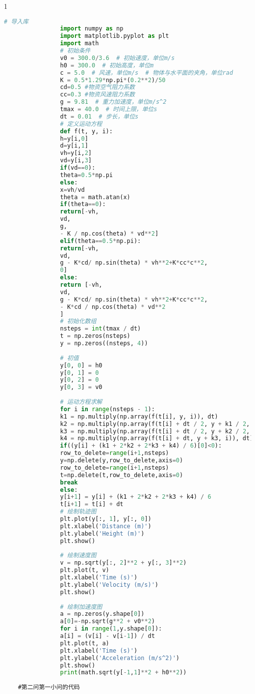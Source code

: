 \documentclass[normalsize]{ctexart}
\begin{document}
\begin{spacing}{1}
\begin{lstlisting}[language={Python}]
				# 导入库
				import numpy as np
				import matplotlib.pyplot as plt
				import math
				# 初始条件
				v0 = 300.0/3.6  # 初始速度，单位m/s
				h0 = 300.0  # 初始高度，单位m
				c = 5.0  # 风速，单位m/s  # 物体与水平面的夹角，单位rad
				K = 0.5*1.29*np.pi*(0.2**2)/50
				cd=0.5 #物资空气阻力系数
				cc=0.3 #物资风速阻力系数
				g = 9.81  # 重力加速度，单位m/s^2
				tmax = 40.0  # 时间上限，单位s
				dt = 0.01  # 步长，单位s
				# 定义运动方程
				def f(t, y, i):
				h=y[i,0]
				d=y[i,1]
				vh=y[i,2]
				vd=y[i,3]
				if(vd==0):
				theta=0.5*np.pi
				else:
				x=vh/vd
				theta = math.atan(x)
				if(theta==0):
				return[-vh,
				vd,
				g,
				- K / np.cos(theta) * vd**2]
				elif(theta==0.5*np.pi):
				return[-vh,
				vd,
				g - K*cd/ np.sin(theta) * vh**2+K*cc*c**2,
				0]
				else:
				return [-vh,
				vd,
				g - K*cd/ np.sin(theta) * vh**2+K*cc*c**2,
				- K*cd / np.cos(theta) * vd**2
				]
				# 初始化数组
				nsteps = int(tmax / dt)
				t = np.zeros(nsteps)
				y = np.zeros((nsteps, 4))
				
				# 初值
				y[0, 0] = h0
				y[0, 1] = 0 
				y[0, 2] = 0
				y[0, 3] = v0
				
				# 运动方程求解
				for i in range(nsteps - 1):
				k1 = np.multiply(np.array(f(t[i], y, i)), dt)
				k2 = np.multiply(np.array(f(t[i] + dt / 2, y + k1 / 2, i)), dt)
				k3 = np.multiply(np.array(f(t[i] + dt / 2, y + k2 / 2, i)), dt)
				k4 = np.multiply(np.array(f(t[i] + dt, y + k3, i)), dt)
				if((y[i] + (k1 + 2*k2 + 2*k3 + k4) / 6)[0]<0):
				row_to_delete=range(i+1,nsteps)
				y=np.delete(y,row_to_delete,axis=0)
				row_to_delete=range(i+1,nsteps)
				t=np.delete(t,row_to_delete,axis=0)
				break
				else:
				y[i+1] = y[i] + (k1 + 2*k2 + 2*k3 + k4) / 6
				t[i+1] = t[i] + dt
				# 绘制轨迹图
				plt.plot(y[:, 1], y[:, 0])
				plt.xlabel('Distance (m)')
				plt.ylabel('Height (m)')
				plt.show()
				
				# 绘制速度图
				v = np.sqrt(y[:, 2]**2 + y[:, 3]**2)
				plt.plot(t, v)
				plt.xlabel('Time (s)')
				plt.ylabel('Velocity (m/s)')
				plt.show()
				
				# 绘制加速度图
				a = np.zeros(y.shape[0])
				a[0]=-np.sqrt(g**2 + v0**2)
				for i in range(1,y.shape[0]):
				a[i] = (v[i] - v[i-1]) / dt
				plt.plot(t, a)
				plt.xlabel('Time (s)')
				plt.ylabel('Acceleration (m/s^2)')
				plt.show()
				print(math.sqrt(y[-1,1]**2 + h0**2))
			\end{lstlisting}
		
	\begin{lstlisting}
	#第二问第一小问的代码
	

\end{lstlisting}
\end{spacing}
\end{document}
